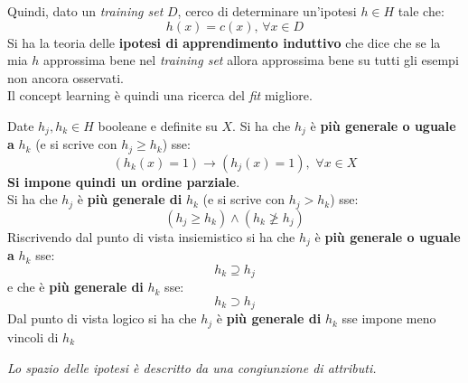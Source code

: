 \documentclass[a4paper,12pt, oneside]{book}
\begin{document}
Quindi, dato un \textit{training set} $D$, cerco di determinare un'ipotesi $h\in
H$ tale che: 
\[h(x)=c(x),\,\forall x\in D\]
Si ha la teoria delle \textbf{ipotesi di apprendimento induttivo} che dice che
se la mia $h$ approssima bene nel \textit{training set} allora approssima bene
su tutti gli esempi non ancora osservati.\\
Il concept learning è quindi una ricerca del \textit{fit} migliore.
\begin{definizione}
  Date $h_j,h_k\in H$ booleane e definite su $X$. Si ha che $h_j$ è \textbf{più
    generale o uguale a} $h_k$ (e si scrive con $h_j\geq h_k$) sse:
  \[(h_k(x)=1)\longrightarrow (h_j(x)=1),\,\,\forall x\in X\]
  \textbf{Si impone quindi un ordine parziale}.\\
  Si ha che $h_j$ è \textbf{più generale di} $h_k$ (e si scrive con $h_j> h_k$)
  sse:
  \[(h_j\geq h_k)\land (h_k\not\geq h_j)\]
  Riscrivendo dal punto di vista insiemistico si ha che $h_j$ è \textbf{più
    generale o uguale a} $h_k$ sse:
  \[h_k\supseteq h_j\]
  e che è \textbf{più generale di} $h_k$ sse:
  \[h_k\supset h_j\]
  Dal punto di vista logico si ha che $h_j$ è \textbf{più generale di} $h_k$ sse
  impone meno vincoli di $h_k$
\end{definizione}
\textit{Lo spazio delle ipotesi è descritto da una congiunzione di attributi.}
\end{document}
